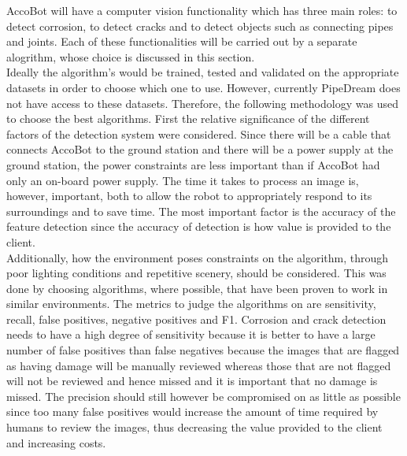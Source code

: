 \documentclass[11pt]{article}		%
\begin{document}
			AccoBot will have a computer vision functionality which has three main roles: to detect corrosion, to detect cracks and to detect objects such as connecting pipes and joints. Each of these functionalities will be carried out by a separate alogrithm, whose choice is discussed in this section.
			\\
	        \hspace*{3ex}Ideally the algorithm's would be trained, tested and validated on the appropriate datasets in order to choose which one to use. However, currently PipeDream does not have access to these datasets. Therefore, the following methodology was used to choose the best algorithms. First the relative significance of the different factors of the detection system were considered. Since there will be a cable that connects AccoBot to the ground station and there will be a power supply at the ground station, the power constraints are less important than if AccoBot had only an on-board power supply. The time it takes to process an image is, however, important, both to allow the robot to appropriately respond to its surroundings and to save time. The most important factor is the accuracy of the feature detection since the accuracy of detection is how value is provided to the client. 
			\\
	        \hspace*{3ex}Additionally, how the environment poses constraints on the algorithm, through poor lighting conditions and repetitive scenery, should be considered. This was done by choosing algorithms, where possible, that have been proven to work in similar environments. The metrics to judge the algorithms on are sensitivity, recall, false positives, negative positives and F1. Corrosion and crack detection needs to have a high degree of sensitivity because it is better to have a large number of false positives than false negatives because the images that are flagged as having damage will be manually reviewed whereas those that are not flagged will not be reviewed and hence missed and it is important that no damage is missed. The precision should still however be compromised on as little as possible since too many false positives would increase the amount of time required by humans to review the images, thus decreasing the value provided to the client and increasing costs. 
\end{document}
